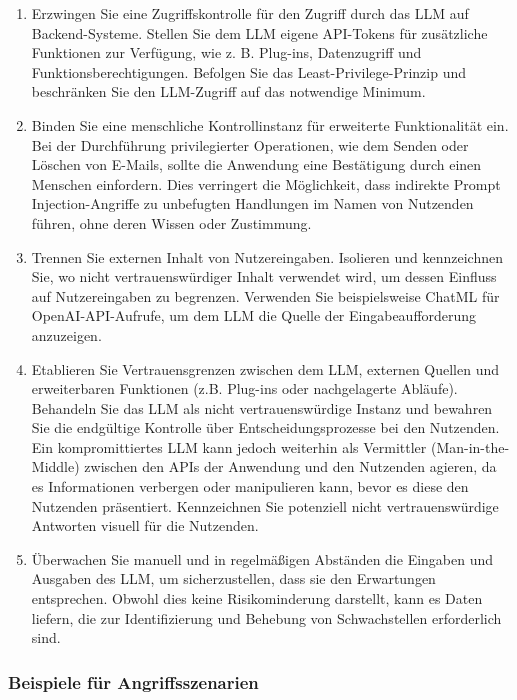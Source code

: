 \documentclass[
]{article}
\providecommand{\tightlist}{%
  \setlength{\itemsep}{0pt}\setlength{\parskip}{0pt}}
\begin{document}
\begin{enumerate}
\def\labelenumi{\arabic{enumi}.}
\tightlist
\item
  Erzwingen Sie eine Zugriffskontrolle für den Zugriff durch das LLM auf
  Backend-Systeme. Stellen Sie dem LLM eigene API-Tokens für zusätzliche
  Funktionen zur Verfügung, wie z. B. Plug-ins, Datenzugriff und
  Funktionsberechtigungen. Befolgen Sie das Least-Privilege-Prinzip und
  beschränken Sie den LLM-Zugriff auf das notwendige Minimum.
\item
  Binden Sie eine menschliche Kontrollinstanz für erweiterte
  Funktionalität ein. Bei der Durchführung privilegierter Operationen,
  wie dem Senden oder Löschen von E-Mails, sollte die Anwendung eine
  Bestätigung durch einen Menschen einfordern. Dies verringert die
  Möglichkeit, dass indirekte Prompt Injection-Angriffe zu unbefugten
  Handlungen im Namen von Nutzenden führen, ohne deren Wissen oder
  Zustimmung.
\item
  Trennen Sie externen Inhalt von Nutzereingaben. Isolieren und
  kennzeichnen Sie, wo nicht vertrauenswürdiger Inhalt verwendet wird,
  um dessen Einfluss auf Nutzereingaben zu begrenzen. Verwenden Sie
  beispielsweise ChatML für OpenAI-API-Aufrufe, um dem LLM die Quelle
  der Eingabeaufforderung anzuzeigen.
\item
  Etablieren Sie Vertrauensgrenzen zwischen dem LLM, externen Quellen
  und erweiterbaren Funktionen (z.B. Plug-ins oder nachgelagerte
  Abläufe). Behandeln Sie das LLM als nicht vertrauenswürdige Instanz
  und bewahren Sie die endgültige Kontrolle über Entscheidungsprozesse
  bei den Nutzenden. Ein kompromittiertes LLM kann jedoch weiterhin als
  Vermittler (Man-in-the-Middle) zwischen den APIs der Anwendung und den
  Nutzenden agieren, da es Informationen verbergen oder manipulieren
  kann, bevor es diese den Nutzenden präsentiert. Kennzeichnen Sie
  potenziell nicht vertrauenswürdige Antworten visuell für die
  Nutzenden.
\item
  Überwachen Sie manuell und in regelmäßigen Abständen die Eingaben und
  Ausgaben des LLM, um sicherzustellen, dass sie den Erwartungen
  entsprechen. Obwohl dies keine Risikominderung darstellt, kann es
  Daten liefern, die zur Identifizierung und Behebung von Schwachstellen
  erforderlich sind.
\end{enumerate}

\subsubsection{Beispiele für
Angriffsszenarien}\label{beispiele-fuxfcr-angriffsszenarien}
\end{document}
